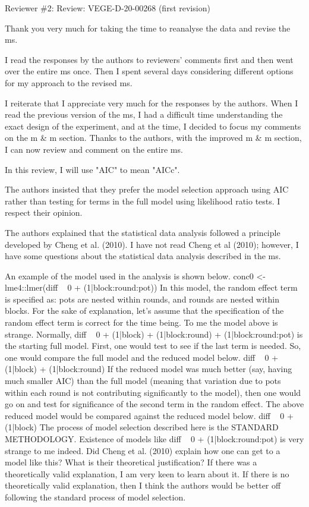 \documentclass[parskip=half]{scrartcl}
\begin{document}
Reviewer \#2: Review: VEGE-D-20-00268 (first revision)

Thank you very much for taking the time to reanalyse the data and revise the ms. 

I read the responses by the authors to reviewers' comments first and then went over the entire ms once.
Then I spent several days considering different options for my approach to the revised ms.

I reiterate that I appreciate very much for the responses by the authors.
When I read the previous version of the ms, I had a difficult time understanding the exact design of the experiment, and at the time, I decided to focus my comments on the m \& m section. Thanks to the authors, with the improved m \& m section, I can now review and comment on the entire ms. 

In this review, I will use "AIC" to mean "AICc".

The authors insisted that they prefer the model selection approach using AIC rather than testing for terms in the full model using likelihood ratio tests.  I respect their opinion.

The authors explained that the statistical data analysis followed a principle developed by Cheng et al. (2010).
I have not read Cheng et al (2010); however, I have some questions about the statistical data analysis described in the ms.

An example of the model used in the analysis is shown below.
conc0 <- lme4::lmer(diff ~ 0 + (1|block:round:pot))
In this model, the random effect term is specified as: pots are nested within rounds, and rounds are nested within blocks.
For the sake of explanation, let's assume that the specification of the random effect term is correct for the time being.
To me the model above is strange.
Normally, diff ~ 0 + (1|block) + (1|block:round) + (1|block:round:pot) is the starting full model.
First, one would test to see if the last term is needed.
So, one would compare the full model and the reduced model below.
diff ~ 0 + (1|block) + (1|block:round)
If the reduced model was much better (say, having much smaller AIC) than the full model (meaning that variation due to pots within each round is not contributing significantly to the model), then one would go on and test for significance of the second term in the random effect. 
The above reduced model would be compared against the reduced model below.
diff ~ 0 + (1|block)
The process of model selection described here is the STANDARD METHODOLOGY.
Existence of models like diff ~ 0 + (1|block:round:pot) is very strange to me indeed.
Did Cheng et al. (2010) explain how one can get to a model like this?
What is their theoretical justification?
If there was a theoretically valid explanation, I am very keen to learn about it.
If there is no theoretically valid explanation, then I think the authors would be better off following the standard process of model selection.
\end{document}

